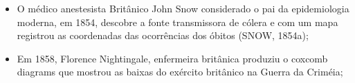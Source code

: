 \begin{itemize}


\item O médico anestesista Britânico John Snow considerado o pai da epidemiologia moderna, em 1854, descobre a fonte transmissora de cólera e com um mapa registrou as coordenadas das ocorrências dos óbitos (SNOW, 1854a);


\item Em 1858, Florence Nightingale, enfermeira britânica produziu o coxcomb diagrams que mostrou as baixas do exército britânico na Guerra da Criméia;

  


\end{itemize}
